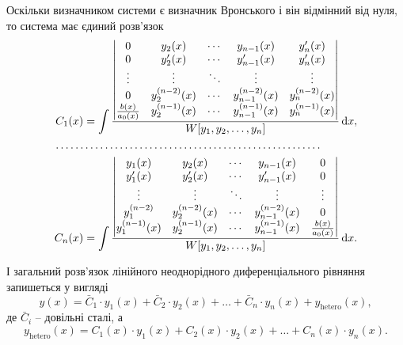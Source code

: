 Оскільки визначником системи є визначник Вронського і він відмінний від нуля, то система має єдиний розв’язок
\begin{equation}
	\label{eq:3.3.25}
	\begin{aligned}
		C_1(x) &= \int \frac{\begin{vmatrix} 0 & y_2(x) & \cdots & y_{n - 1}(x) & y_n'(x) \\ 0 & y_2'(x) & \cdots & y_{n - 1}'(x) & y_n'(x) \\ \vdots & \vdots & \ddots & \vdots & \vdots \\ 0 & y_2^{(n - 2)}(x) & \cdots & y_{n - 1}^{(n - 2)}(x) & y_n^{(n - 2)}(x) \\ \frac{b(x)}{a_0(x)} & y_2^{(n - 1)}(x) & \cdots & y_{n - 1}^{(n - 1)}(x) & y_n^{(n - 1)}(x) \end{vmatrix}}{W[y_1, y_2, \ldots, y_n]} \mathop{}\!\mathrm{d} x, \\
		\ldots \ldots & \ldots \ldots \ldots \ldots \ldots \ldots \ldots \ldots \ldots \ldots \ldots \ldots \ldots \ldots \ldots \ldots \\
		C_n(x) &= \int \frac{\begin{vmatrix} y_1(x) & y_2(x) & \cdots & y_{n - 1}(x) & 0 \\ y_1'(x) & y_2'(x) & \cdots & y_{n - 1}'(x) & 0 \\ \vdots & \vdots & \ddots & \vdots & \vdots \\ y_1^{(n - 2)} & y_2^{(n - 2)}(x) & \cdots & y_{n - 1}^{(n - 2)}(x) & 0 \\ y_1^{(n - 1)}(x) & y_2^{(n - 1)}(x) & \cdots & y_{n - 1}^{(n - 1)}(x) & \frac{b(x)}{a_0(x)} \end{vmatrix}}{W[y_1, y_2, \ldots, y_n]} \mathop{}\!\mathrm{d} x.
	\end{aligned}
\end{equation}

І загальний розв’язок лінійного неоднорідного диференціального рівняння запишеться у вигляді
\begin{equation}
	\label{eq:3.3.26}
	y(x) = \bar C_1 \cdot y_1(x) + \bar C_2 \cdot y_2(x) + \ldots + \bar C_n \cdot y_n(x) + y_{\text{hetero}}(x),
\end{equation}
де $\bar C_i$ -- довільні сталі, а
\begin{equation}
	\label{eq:3.3.27}
	y_{\text{hetero}}(x) = C_1(x) \cdot y_1(x) + C_2(x) \cdot y_2(x) + \ldots + C_n(x) \cdot y_n(x).
\end{equation}

